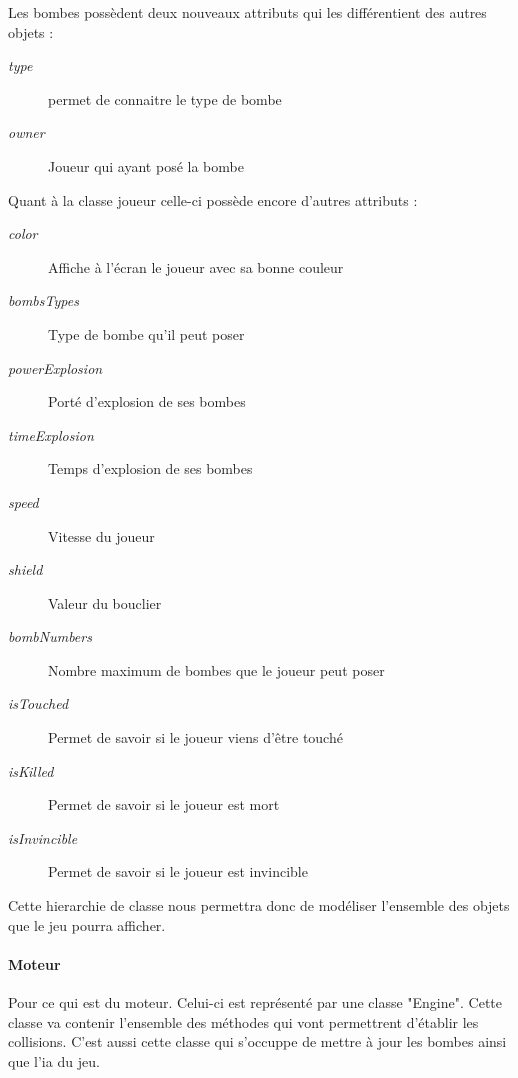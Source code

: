 		Les bombes possèdent deux nouveaux attributs qui les différentient 
		des autres objets :
		
			\begin{description}
				\item [\textit{type}]{permet de connaitre le type de bombe}
				\item [\textit{owner}]{Joueur qui ayant posé la bombe}
			\end{description}
			
		Quant à la classe joueur celle-ci possède encore d'autres attributs :
		
		\begin{description}
			\item [\textit{color}]{Affiche à l'écran le joueur avec sa bonne couleur}
			\item [\textit{bombsTypes}]{Type de bombe qu'il peut poser}
			\item [\textit{powerExplosion}]{Porté d'explosion de ses bombes}
			\item [\textit{timeExplosion}]{Temps d'explosion de ses bombes}
			\item [\textit{speed}]{Vitesse du joueur}
			\item [\textit{shield}]{Valeur du bouclier}
			\item [\textit{bombNumbers}]{Nombre maximum de bombes que le joueur peut poser}
			\item [\textit{isTouched}]{Permet de savoir si le joueur viens d'être touché}
			\item [\textit{isKilled}]{Permet de savoir si le joueur est mort}
			\item [\textit{isInvincible}]{Permet de savoir si le joueur est invincible}
		\end{description}
	
		Cette hierarchie de classe nous permettra donc de modéliser l'ensemble 
		des objets que le jeu pourra afficher.
	
	
	\paragraph{Moteur\\}
	
		Pour ce qui est du moteur.
		Celui-ci est représenté par une classe "Engine".
		Cette classe va contenir l'ensemble des méthodes qui vont permettrent 
		d'établir les collisions.
		C'est aussi cette classe qui s'occuppe de mettre à jour les bombes 
		ainsi que l'\gls{ia} du jeu.
		
